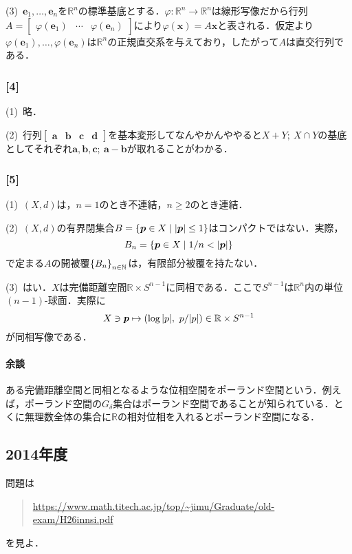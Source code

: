 \documentclass[a4j]{ltjsarticle}
\newcommand{\Rset}{\mathbb{R}}
\newcommand{\Nset}{\mathbb{N}}
\newcommand{\1}{\mathbbm{1}}
\numberwithin{equation}{section}
\theoremstyle{definition}
\begin{document}
(3)\ $\bm{e}_1,\ldots,\bm{e}_n$を$\Rset^n$の標準基底とする．$\varphi\colon \Rset^n\to \Rset^n$は線形写像だから行列$A=\begin{bmatrix}
    \varphi(\bm{e}_1) & \cdots & \varphi(\bm{e}_n)
\end{bmatrix}$により$\varphi(\bm{x})=A\bm{x}$と表される．仮定より$\varphi(\bm{e}_1),\ldots,\varphi(\bm{e}_n)$は$\Rset^n$の正規直交系を与えており，したがって$A$は直交行列である．

\subsubsection*{[4]}
(1)\ 略．

(2)\ 行列$\begin{bmatrix}
    \mathbf{a} & \mathbf{b} & \mathbf{c} & \mathbf{d}
\end{bmatrix}$を基本変形してなんやかんややると$X+Y;\ X\cap Y$の基底としてそれぞれ$\mathbf{a},\mathbf{b},\mathbf{c};\ \mathbf{a}-\mathbf{b}$が取れることがわかる．

\subsubsection*{[5]}
(1)\ $(X,d)$は，$n=1$のとき不連結，$n\geq2$のとき連結．

(2)\ $(X,d)$の有界閉集合$B=\qty{\bm{p}\in X\mid \abs{\bm p}\leq 1}$はコンパクトではない．実際，
\begin{equation}
    B_n=\qty{\bm{p}\in X\mid  1/n< \abs{\bm{p}}}
\end{equation}
で定まる$A$の開被覆$\qty{B_n}_{n\in\Nset}$は，有限部分被覆を持たない．

(3)\ はい．$X$は完備距離空間$\Rset \times S^{n-1}$に同相である．ここで$S^{n-1}$は$\Rset^n$内の単位$(n-1)$-球面．実際に
\begin{equation}
    X\ni \bm{p}\mapsto(\log \abs{p},\ p/\abs{p})\in \Rset\times S^{n-1}
\end{equation}
が同相写像である．
\paragraph*{余談}ある完備距離空間と同相となるような位相空間をポーランド空間という．例えば，ポーランド空間の$G_\delta$集合はポーランド空間であることが知られている．とくに無理数全体の集合に$\Rset$の相対位相を入れるとポーランド空間になる．
\subsection{2014年度}
問題は
\begin{quote}
    \url{https://www.math.titech.ac.jp/top/~jimu/Graduate/old-exam/H26innsi.pdf}
\end{quote}
を見よ．
\end{document}
